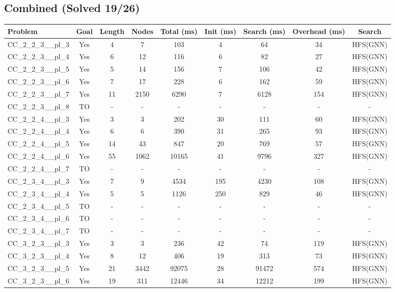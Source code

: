 \documentclass{article}
\begin{document}
\subsection*{Combined (Solved 19/26)}
\begin{tabular}{lcccccccc}
\toprule
Problem & Goal & Length & Nodes & Total (ms) & Init (ms) & Search (ms) & Overhead (ms) & Search \\
\midrule
CC\_2\_2\_3\_\_pl\_3 & Yes & 4 & 7 & 103 & 4 & 64 & 34 & HFS(GNN) \\
CC\_2\_2\_3\_\_pl\_4 & Yes & 6 & 12 & 116 & 6 & 82 & 27 & HFS(GNN) \\
CC\_2\_2\_3\_\_pl\_5 & Yes & 5 & 14 & 156 & 7 & 106 & 42 & HFS(GNN) \\
CC\_2\_2\_3\_\_pl\_6 & Yes & 7 & 17 & 228 & 6 & 162 & 59 & HFS(GNN) \\
CC\_2\_2\_3\_\_pl\_7 & Yes & 11 & 2150 & 6290 & 7 & 6128 & 154 & HFS(GNN) \\
CC\_2\_2\_3\_\_pl\_8 & TO & - & - & - & - & - & - & - \\
CC\_2\_2\_4\_\_pl\_3 & Yes & 3 & 3 & 202 & 30 & 111 & 60 & HFS(GNN) \\
CC\_2\_2\_4\_\_pl\_4 & Yes & 6 & 6 & 390 & 31 & 265 & 93 & HFS(GNN) \\
CC\_2\_2\_4\_\_pl\_5 & Yes & 14 & 43 & 847 & 20 & 769 & 57 & HFS(GNN) \\
CC\_2\_2\_4\_\_pl\_6 & Yes & 55 & 1062 & 10165 & 41 & 9796 & 327 & HFS(GNN) \\
CC\_2\_2\_4\_\_pl\_7 & TO & - & - & - & - & - & - & - \\
CC\_2\_3\_4\_\_pl\_3 & Yes & 7 & 9 & 4534 & 195 & 4230 & 108 & HFS(GNN) \\
CC\_2\_3\_4\_\_pl\_4 & Yes & 5 & 5 & 1126 & 250 & 829 & 46 & HFS(GNN) \\
CC\_2\_3\_4\_\_pl\_5 & TO & - & - & - & - & - & - & - \\
CC\_2\_3\_4\_\_pl\_6 & TO & - & - & - & - & - & - & - \\
CC\_2\_3\_4\_\_pl\_7 & TO & - & - & - & - & - & - & - \\
CC\_3\_2\_3\_\_pl\_3 & Yes & 3 & 3 & 236 & 42 & 74 & 119 & HFS(GNN) \\
CC\_3\_2\_3\_\_pl\_4 & Yes & 8 & 12 & 406 & 19 & 313 & 73 & HFS(GNN) \\
CC\_3\_2\_3\_\_pl\_5 & Yes & 21 & 3442 & 92075 & 28 & 91472 & 574 & HFS(GNN) \\
CC\_3\_2\_3\_\_pl\_6 & Yes & 19 & 311 & 12446 & 34 & 12212 & 199 & HFS(GNN) \\

\end{tabular}
\end{document}
